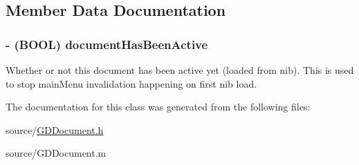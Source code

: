 \subsection{Member Data Documentation}
\hypertarget{interface_g_d_document_ab89b49ec7008a1b538d72bff8a142a8e}{
\subsubsection[{documentHasBeenActive}]{\setlength{\rightskip}{0pt plus 5cm}-\/ (BOOL) {\bf documentHasBeenActive}}}
\label{interface_g_d_document_ab89b49ec7008a1b538d72bff8a142a8e}


Whether or not this document has been active yet (loaded from nib). This is used to stop mainMenu invalidation happening on first nib load. 

The documentation for this class was generated from the following files:\begin{DoxyCompactItemize}
\item 
source/\hyperlink{_g_d_document_8h}{GDDocument.h}\item 
source/GDDocument.m\end{DoxyCompactItemize}

